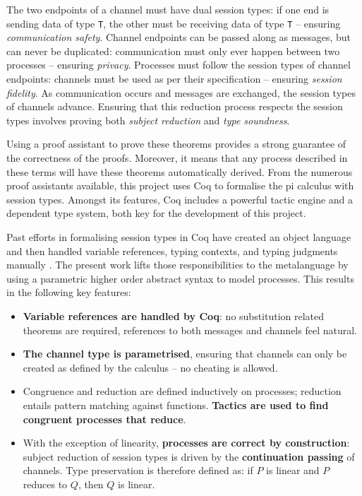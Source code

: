 \documentclass{mproj}
\begin{document}
The two endpoints of a channel must have dual session types: if one end is
sending data of type \texttt{T}, the other must be receiving data of type
\texttt{T} -- ensuring \textit{communication safety}. Channel endpoints can be
passed along as messages, but can never be duplicated: communication must only
ever happen between two processes -- ensuring \textit{privacy}.  Processes must
follow the session types of channel endpoints: channels must be used as per
their specification -- ensuring \textit{session fidelity}. As communication
occurs and messages are exchanged, the session types of channels advance.
Ensuring that this reduction process respects the session types involves proving
both \textit{subject reduction} and \textit{type soundness}. \cite{Dardha2016m}

Using a proof assistant to prove these theorems provides a strong guarantee of
the correctness of the proofs. Moreover, it means that any process described in
these terms will have these theorems automatically derived. From the numerous
proof assistants available, this project uses Coq to formalise the pi calculus
with session types. Amongst its features, Coq includes a powerful tactic engine
and a dependent type system, both key for the development of this project.

Past efforts in formalising session types in Coq have created an object language
and then handled variable references, typing contexts, and typing judgments
manually \cite{Dilmore2019}. The present work lifts those responsibilities to
the metalanguage by using a parametric higher order abstract syntax to model
processes. This results in the following key features:

\begin{itemize}
    \item \textbf{Variable references are handled by Coq}: no substitution
        related theorems are required, references to both messages and channels
        feel natural.
    \item \textbf{The channel type is parametrised}, ensuring that channels can
        only be created as defined by the calculus -- no cheating is allowed.
    \item Congruence and reduction are defined inductively on processes;
        reduction entails pattern matching against functions. \textbf{Tactics
        are used to find congruent processes that reduce}.
    \item With the exception of linearity, \textbf{processes are correct by
        construction}: subject reduction of session types is driven by the
        \textbf{continuation passing} of channels. Type preservation is
        therefore defined as: if $P$ is linear and $P$ reduces to $Q$, then $Q$
        is linear.
\end{itemize}




\end{document}
